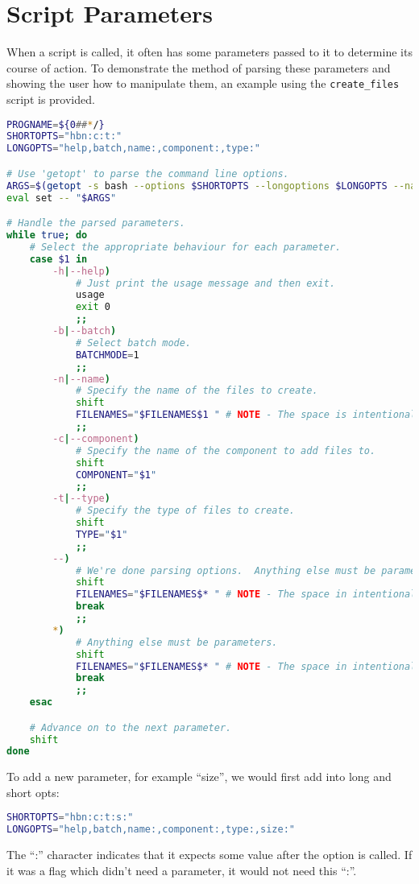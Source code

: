 \documentclass[a4paper, oneside, 11pt, titlepage, onecolumn, openright]{report}
\begin{document}
\section{Script Parameters}
			\label{s:ScriptParameters}
			
			When a script is called, it often has some parameters passed to it to determine its course of action. To demonstrate the method of parsing these parameters and showing the user how to manipulate them, an example using the \texttt{create\_files} script is provided.
\begin{lstlisting}[frame=trBL, breaklines=true, language = bash]
PROGNAME=${0##*/} 
SHORTOPTS="hbn:c:t:"
LONGOPTS="help,batch,name:,component:,type:"

# Use 'getopt' to parse the command line options.
ARGS=$(getopt -s bash --options $SHORTOPTS --longoptions $LONGOPTS --name $PROGNAME -- "$@")
eval set -- "$ARGS"

# Handle the parsed parameters.
while true; do
	# Select the appropriate behaviour for each parameter.
	case $1 in
		-h|--help)
			# Just print the usage message and then exit.
			usage
			exit 0
			;;
		-b|--batch)
			# Select batch mode.
			BATCHMODE=1
			;;
		-n|--name)
			# Specify the name of the files to create.
			shift
			FILENAMES="$FILENAMES$1 " # NOTE - The space is intentional!
			;;
		-c|--component)
			# Specify the name of the component to add files to.
			shift
			COMPONENT="$1"
			;;
		-t|--type)
			# Specify the type of files to create.
			shift
			TYPE="$1"
			;;
		--)
			# We're done parsing options.  Anything else must be parameters.
			shift
			FILENAMES="$FILENAMES$* " # NOTE - The space in intentional!
			break
			;;
		*)
			# Anything else must be parameters.
			shift
			FILENAMES="$FILENAMES$* " # NOTE - The space in intentional!
			break
			;;
	esac

	# Advance on to the next parameter.
	shift
done
\end{lstlisting}

To add a new parameter, for example ``size'', we would first add into long and short opts:

\begin{lstlisting}[frame=trBL, breaklines=true, language = bash]
SHORTOPTS="hbn:c:t:s:"
LONGOPTS="help,batch,name:,component:,type:,size:"
\end{lstlisting}

The ``:'' character indicates that it expects some value after the option is called. If it was a flag which didn't need a parameter, it would not need this ``:''.
\end{document}
